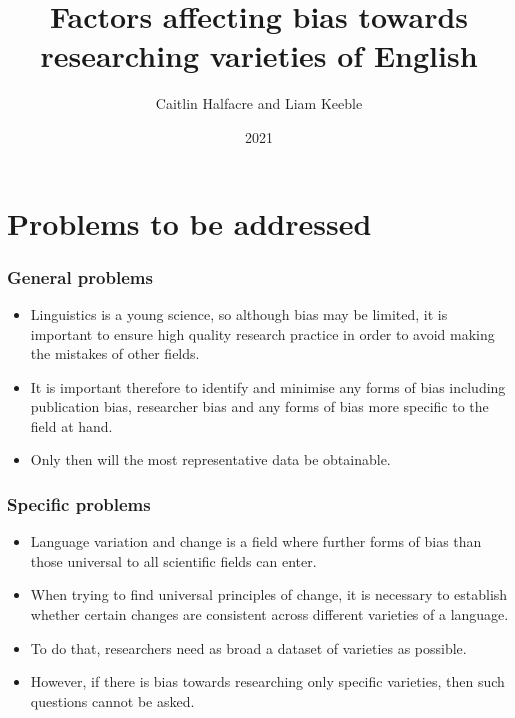 \documentclass{beamer}
\title{Factors affecting bias towards researching varieties of English}
\author{Caitlin Halfacre and Liam Keeble}
\date{2021}
\begin{document}
\frame{\titlepage}


\section{Problems to be addressed}
\begin{frame}
\frametitle{General problems}
\begin{itemize}
\item Linguistics is a young science, so although bias may be limited, it is important to ensure high quality research practice in order to avoid making the mistakes of other fields.
\item It is important therefore to identify and minimise any forms of bias including publication bias, researcher bias and any forms of bias more specific to the field at hand.
\item Only then will the most representative data be obtainable.
\end{itemize}
\end{frame}


\begin{frame}
\frametitle{Specific problems}
\begin{itemize}
\item Language variation and change is a field where further forms of bias than those universal to all scientific fields can enter.
\item When trying to find universal principles of change, it is necessary to establish whether certain changes are consistent across different varieties of a language.
\item To do that, researchers need as broad a dataset of varieties as possible.
\item However, if there is bias towards researching only specific varieties, then such questions cannot be asked.

\end{itemize}

\end{frame}
\end{document}
